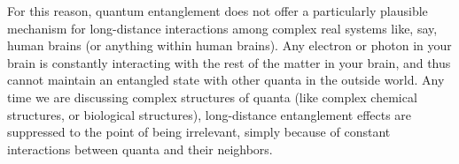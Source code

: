 \documentclass[12pt,onecolumn,preprintnumbers,amsmath,amssymbn,reprint,nofootinbib,superscriptaddress]{revtex4}    %
\begin{document}
For this reason, quantum entanglement does not offer a particularly plausible mechanism for long-distance interactions among complex real systems like, say, human brains (or anything within human brains).  Any electron or photon in your brain is constantly interacting with the rest of the matter in your brain, and thus cannot maintain an entangled state with other quanta in the outside world.  Any time we are discussing complex structures of quanta (like complex chemical structures, or biological structures), long-distance entanglement effects are suppressed to the point of being irrelevant, simply because of constant interactions between quanta and their neighbors.

\end{document}
